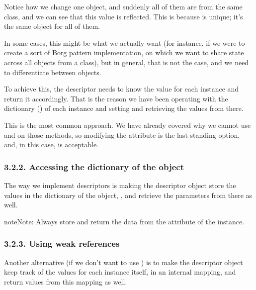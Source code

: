 \documentclass[a4paper,10pt,english]{sphinxmanual}
\begin{document}
Notice how we change one object, and suddenly all of them are from the same class, and
we can see that this value is reflected. This is because  is
unique; it’s the same object for all of them.

In some cases, this might be what we actually want (for instance, if we were to create a sort
of Borg pattern implementation, on which we want to share state across all objects from a
class), but in general, that is not the case, and we need to differentiate between objects.

To achieve this, the descriptor needs to know the value for each instance and return it
accordingly. That is the reason we have been operating with the dictionary () of
each instance and setting and retrieving the values from there.

This is the most common approach. We have already covered why we cannot use
 and  on those methods, so modifying the  attribute is the
last standing option, and, in this case, is acceptable.


\subsubsection{3.2.2. Accessing the dictionary of the object}
\label{\detokenize{chapters/6_descriptors/index:accessing-the-dictionary-of-the-object}}
The way we implement descriptors is making the descriptor object
store the values in the dictionary of the object, , and retrieve the parameters from
there as well.

\begin{sphinxadmonition}{note}{Note:}
Always store and return the data from the  attribute of the instance.
\end{sphinxadmonition}


\subsubsection{3.2.3. Using weak references}
\label{\detokenize{chapters/6_descriptors/index:using-weak-references}}
Another alternative (if we don’t want to use ) is to make the descriptor object
keep track of the values for each instance itself, in an internal mapping, and return values
from this mapping as well.
\end{document}
